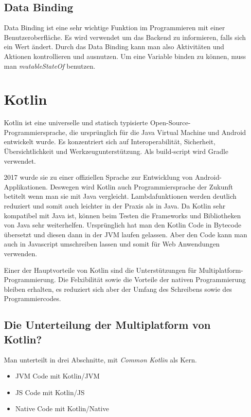 \subsection{Data Binding}
Data Binding ist eine sehr wichtige Funktion im Programmieren mit einer Benutzeroberfläche. Es wird verwendet um das Backend 
zu informieren, falls sich ein Wert ändert. Durch das Data Binding kann man also Aktivitäten und Aktionen kontrollieren und ausnutzen.
Um eine Variable binden zu können, muss man \textit{mutableStateOf} benutzen. 


\pagebreak
\section{Kotlin}
\cite{Kotlin1}
\cite{Kotlin2}
\author{Bozidar Spasenovic}
Kotlin ist eine universelle und statisch typisierte Open-Source-Programmiersprache, die ursprünglich für die Java Virtual Machine und Android entwickelt wurde.
Es konzentriert sich auf Interoperabilität, Sicherheit, Übersichtlichkeit und Werkzeugunterstützung. Als build-script wird Gradle verwendet.

2017 wurde sie zu einer offiziellen Sprache zur Entwicklung von Android-Applikationen. Deswegen wird Kotlin auch Programmiersprache der Zukunft betitelt wenn man sie mit Java vergleicht.
Lambdafunktionen werden deutlich reduziert und somit auch leichter in der Praxis als in Java. 
Da Kotlin sehr kompatibel mit Java ist, können beim Testen die Frameworks und Bibliotheken von Java sehr weiterhelfen.  
Ursprünglich hat man den Kotlin Code in Bytecode übersetzt und diesen dann in der JVM laufen gelassen. 
Aber den Code kann man auch in Javascript umschreiben lassen und somit für Web Anwendungen verwenden.

Einer der Hauptvorteile von Kotlin sind die Unterstützungen für Multiplatform-Programmierung.
Die Felxibilität sowie die Vorteile der nativen Programmierung bleiben erhalten, es reduziert sich aber 
der Umfang des Schreibens sowie des Programmiercodes.


\subsection{Die Unterteilung der Multiplatform von Kotlin?}

Man unterteilt in drei Abschnitte, mit \textit{Common Kotlin} als Kern.

\begin{itemize}
    \item JVM Code mit Kotlin/JVM
    \item JS Code mit Kotlin/JS
    \item Native Code mit Kotlin/Native
\end{itemize}

